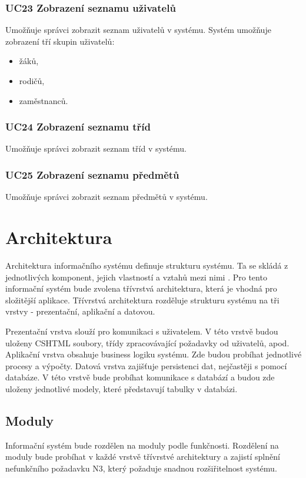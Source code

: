 \subsubsection*{UC23 Zobrazení seznamu uživatelů}
Umožňuje správci zobrazit seznam uživatelů v systému. Systém umožňuje zobrazení tří skupin uživatelů:
\begin{itemize}
    \item žáků,
    \item rodičů, 
    \item zaměstnanců.
\end{itemize}

\subsubsection*{UC24 Zobrazení seznamu tříd}
Umožňuje správci zobrazit seznam tříd v systému.

\subsubsection*{UC25 Zobrazení seznamu předmětů}
Umožňuje správci zobrazit seznam předmětů v systému.

\section{Architektura}
Architektura informačního systému definuje strukturu systému. Ta se skládá z jednotlivých komponent, jejich vlastností a vztahů mezi nimi \cite{sw-architektura}. Pro tento informační systém bude zvolena třívrstvá architektura, která je vhodná pro složitější aplikace. Třívrstvá architektura rozděluje strukturu systému na tři vrstvy - prezentační, aplikační a datovou.

Prezentační vrstva slouží pro komunikaci s uživatelem. V této vrstvě budou uloženy CSHTML soubory, třídy zpracovávající požadavky od uživatelů, apod. Aplikační vrstva obsahuje business logiku systému. Zde budou probíhat jednotlivé procesy a výpočty. Datová vrstva zajišťuje persistenci dat, nejčastěji s pomocí databáze. V této vrstvě bude probíhat komunikace s databází a budou zde uloženy jednotlivé modely, které představují tabulky v databázi.

\subsection{Moduly}
Informační systém bude rozdělen na moduly podle funkčnosti. Rozdělení na moduly bude probíhat v každé vrstvě třívrstvé architektury a zajistí splnění nefunkčního požadavku N3, který požaduje snadnou rozšiřitelnost systému.

